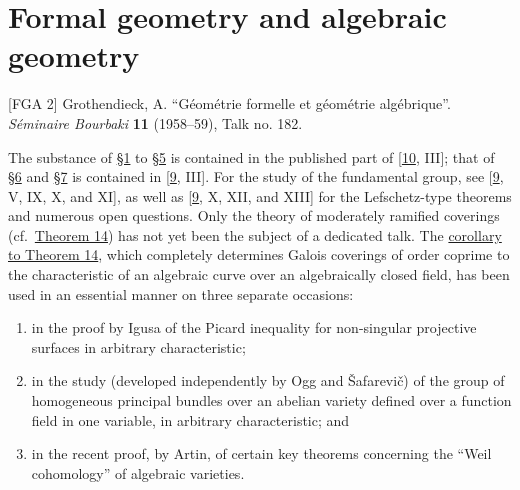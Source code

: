 \documentclass{article}
\newcommand{\oldpage}[1]{\marginpar{\footnotesize$\Big\vert$ \textit{p.~#1}}}
\theoremstyle{definition}
\theoremstyle{definition}
\theoremstyle{definition}
\theoremstyle{definition}
\theoremstyle{remark}
\begin{document}
\hypertarget{fga-2}{%
\section{Formal geometry and algebraic geometry}\label{fga-2}}

\providecommand{\scr}[1]{{\mathscr{#1}}}
\renewcommand{\cal}[1]{{\mathcal{#1}}}
\renewcommand{\frak}[1]{{\mathfrak{#1}}}
\renewcommand{\geq}{\geqslant}
\renewcommand{\leq}{\leqslant}

\providecommand{\PP}{\mathbb{P}}
\providecommand{\ZZ}{\mathbb{Z}}
\providecommand{\red}{\mathrm{red}}

\providecommand{\Spec}{\operatorname{Spec}}
\providecommand{\supp}{\operatorname{supp}}
\providecommand{\RR}{\operatorname{R}}
\providecommand{\Hom}{\operatorname{Hom}}
\providecommand{\shHom}{\mathscr{H}\kern -.5pt om}
\providecommand{\Aut}{\operatorname{Aut}}
\providecommand{\shAut}{\mathscr{A}\kern -.5pt ut}
\providecommand{\gr}{\operatorname{gr}}

{[}FGA 2{]}
Grothendieck, A.
``Géométrie formelle et géométrie algébrique''.
\emph{Séminaire Bourbaki} \textbf{11} (1958--59), Talk no. 182.

\oldpage{C-03}The substance of \protect\hyperlink{fga-2-section-1}{§1} to \protect\hyperlink{fga-2-section-5}{§5} is contained in the published part of {[}\protect\hyperlink{ref-GD1960}{10}, III{]}; that of \protect\hyperlink{fga-2-section-6}{§6} and \protect\hyperlink{fga-2-section-7}{§7} is contained in {[}\protect\hyperlink{ref-Gro1960b}{9}, III{]}.
For the study of the fundamental group, see {[}\protect\hyperlink{ref-Gro1960b}{9}, V, IX, X, and XI{]}, as well as {[}\protect\hyperlink{ref-Gro1960b}{9}, X, XII, and XIII{]} for the Lefschetz-type theorems and numerous open questions.
Only the theory of moderately ramified coverings (cf.~\protect\hyperlink{fga-2-theorem-14}{Theorem 14}) has not yet been the subject of a dedicated talk.
The \protect\hyperlink{fga-2-theorem-14-corollary-1}{corollary to Theorem 14}, which completely determines Galois coverings of order coprime to the characteristic of an algebraic curve over an algebraically closed field, has been used in an essential manner on three separate occasions:

\begin{enumerate}
\def\labelenumi{\arabic{enumi}.}
\item
  in the proof by Igusa of the Picard inequality for non-singular projective surfaces in arbitrary characteristic;
\item
  in the study (developed independently by Ogg and Šafarevič) of the group of homogeneous principal bundles over an abelian variety defined over a function field in one variable, in arbitrary characteristic; and
\item
  in the recent proof, by Artin, of certain key theorems concerning the ``Weil cohomology'' of algebraic varieties.
\end{enumerate}
\end{document}
